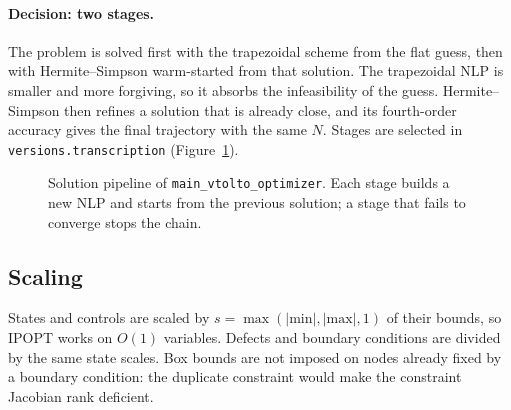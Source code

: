 \documentclass[11pt,a4paper]{article}
\newcommand{\code}[1]{\texttt{\small #1}}
\begin{document}
\paragraph{Decision: two stages.} The problem is solved first with the trapezoidal scheme from the
flat guess, then with Hermite--Simpson warm-started from that solution. The trapezoidal NLP is
smaller and more forgiving, so it absorbs the infeasibility of the guess. Hermite--Simpson then
refines a solution that is already close, and its fourth-order accuracy gives the final trajectory
with the same $N$. Stages are selected in \code{versions.transcription} (Figure~\ref{fig:pipeline}).


\begin{figure}[h]
\centering
{}
\caption{Solution pipeline of \code{main\_vtolto\_optimizer}. Each stage builds a new NLP and
starts from the previous solution; a stage that fails to converge stops the chain.}
\label{fig:pipeline}
\end{figure}

\subsection{Scaling}
States and controls are scaled by $s = \max(|\text{min}|, |\text{max}|, 1)$ of their bounds, so IPOPT works on
$O(1)$ variables. Defects and boundary conditions are divided by the same state scales.
Box bounds are not imposed on nodes already fixed by a boundary condition: the duplicate constraint
would make the constraint Jacobian rank deficient.
\end{document}
